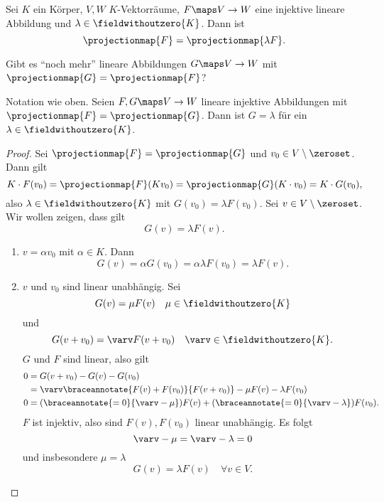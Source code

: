  Sei \( K \) ein Körper, \( V,W \) \( K \)-Vektorräume, \( F\maps V\to W \) eine injektive lineare Abbildung und \( \lambda\in \fieldwithoutzero{K} \). Dann ist
\begin{equation*}
  \projectionmap{F}=\projectionmap{\lambda F}.
\end{equation*}
\begin{frage*}
  Gibt es \enquote{noch mehr} lineare Abbildungen \( G\maps V\to W \) mit \( \projectionmap{G}=\projectionmap{F} \)?
\end{frage*}
\begin{lemma}
  Notation wie oben. Seien \( F,G\maps V\to W \) lineare injektive Abbildungen mit \( \projectionmap{F}=\projectionmap{G} \). Dann ist \( G=\lambda  \) für ein \( \lambda\in \fieldwithoutzero{K} \).
\end{lemma}
\begin{proof}
  Sei \( \projectionmap{F}=\projectionmap{G} \) und \( v_0\in V\setminus\zeroset \). Dann gilt
  \begin{equation*}
    K\cdot F(v_0)=\projectionmap{F}(Kv_0)=\projectionmap{G}(K\cdot v_0)=K\cdot G(v_0),
  \end{equation*}
  also \texists \( \lambda\in \fieldwithoutzero{K} \) mit \( G(v_0)=\lambda F(v_0) \). Sei \( v\in V\setminus \zeroset \). Wir wollen zeigen, dass gilt
  \begin{equation*}
    G(v)=\lambda F(v).
  \end{equation*}
  \begin{enumerate}[label=Fall \rechtsklammer{\alph*}]
    \item \( v=\alpha v_0 \) mit \( \alpha\in K \). Dann 
    \begin{equation*}
      G(v)=\alpha G(v_0)=\alpha \lambda F(v_0)=\lambda F(v).
    \end{equation*}
    \item \( v \) und \( v_0 \) sind linear unabhängig. Sei
    \begin{equation*}
      G(v)=\mu F(v)\quad \mu\in \fieldwithoutzero{K}
    \end{equation*}
    und
    \begin{equation*}
      G(v+v_0)=\varv F(v+v_0)\quad \varv\in \fieldwithoutzero{K}.
    \end{equation*}
    \( G \) und \( F \) sind linear, also gilt
    \begin{align*}
      0&=G(v+v_0)-G(v)-G(v_0)\\
      &=\varv \braceannotate{F(v)+F(v_0)}{F(v+v_0)}-\mu F(v)-\lambda F(v_0)\\
      0&=(\braceannotate{=0}{\varv-\mu})F(v)+(\braceannotate{=0}{\varv-\lambda})F(v_0).
    \end{align*}
    \( F \) ist injektiv, also sind \( F(v), F(v_0) \)  linear unabhängig. Es folgt 
    \begin{equation*}
      \varv-\mu=\varv-\lambda=0
    \end{equation*}
    und insbesondere \( \mu=\lambda \) \dh
    \begin{equation*}
      G(v)=\lambda F(v)\quad \forall v\in V.
    \end{equation*}
  \end{enumerate}
\end{proof}
